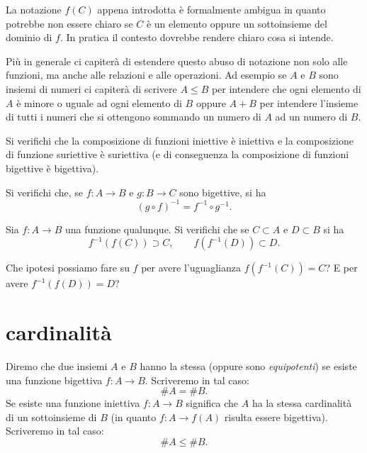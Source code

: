 La notazione $f(C)$ appena introdotta è formalmente ambigua in quanto
potrebbe non essere chiaro se $C$ è un elemento oppure un sottoinsieme
del dominio di $f$.
In pratica il contesto dovrebbe rendere chiaro cosa si intende.

Più in generale ci capiterà di estendere questo abuso di notazione non solo
alle funzioni, ma anche alle relazioni e alle operazioni.
Ad esempio se $A$ e $B$ sono insiemi di numeri ci capiterà di scrivere $A\le B$
per intendere che ogni elemento di $A$ è minore o uguale ad ogni elemento di $B$
oppure $A+B$ per intendere l'insieme di tutti i numeri che si ottengono sommando
un numero di $A$ ad un numero di $B$.

\begin{exercise}
Si verifichi che la composizione di funzioni iniettive è iniettiva e la composizione 
di funzione suriettive è suriettiva 
(e di conseguenza la composizione di funzioni bigettive è bigettiva).

Si verifichi che, se $f \colon A\to B$ e $g\colon B\to C$ sono bigettive, si ha 
\[
  (g\circ f)^{-1} = f^{-1} \circ g^{-1}.
\]
\end{exercise}

\begin{exercise}
  Sia $f\colon A \to B$ una funzione qualunque. 
  Si verifichi che se $C\subset A$ e $D\subset B$ si ha 
  \[
    f^{-1}(f(C))\supset C,
    \qquad 
    f(f^{-1}(D)) \subset D. 
  \]
  
  Che ipotesi possiamo fare su $f$ per avere l'uguaglianza
  $f(f^{-1}(C)) = C$?
  E per avere $f^{-1}(f(D)) = D$?
\end{exercise}

\section{cardinalità}

\begin{definition}[cardinalità]
  Diremo che due insiemi $A$ e $B$ hanno la stessa  
  (oppure sono \emph{equipotenti}) 
  se esiste una funzione bigettiva $f\colon A \to B$.
  Scriveremo in tal caso:
  \[
    \# A = \# B.  
  \] 
  Se esiste una funzione iniettiva $f\colon A\to B$ significa che 
  $A$ ha la stessa cardinalità di un sottoinsieme di $B$ (in quanto $f\colon A \to f(A)$
  risulta essere bigettiva). Scriveremo in tal caso:
  \[
    \# A \le \#B.
  \]
\end{definition}

